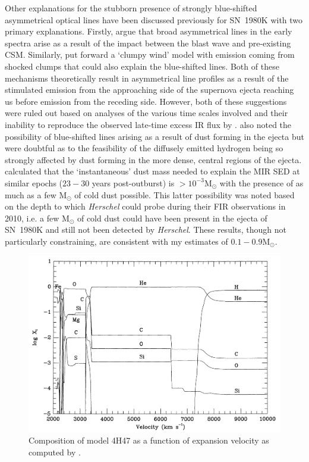 Other explanations for the stubborn presence of strongly blue-shifted asymmetrical optical lines have been discussed previously for SN~1980K  with two primary explanations.  Firstly, \citet{Fesen1990} argue that broad asymmetrical lines in the early spectra arise as a result of the impact between the blast wave and pre-existing CSM.  Similarly, \citet{Chugai1994} put forward a `clumpy wind' model with emission coming from shocked clumps that could also explain the blue-shifted lines.  Both of these mechanisms theoretically result in asymmetrical line profiles as a result of the stimulated emission from the approaching side of the supernova ejecta reaching us before emission from the receding side.  However, both of these suggestions were ruled out based on analyses of the various time scales involved and their inability to reproduce the observed late-time excess IR flux by \citet{Sugerman2012}.  \citet{Fesen1990}  also noted the possibility of blue-shifted lines  arising as a result of dust forming in the ejecta but were doubtful as to the feasibility of the diffusely emitted hydrogen being so strongly affected by dust forming in the more dense, central regions of the ejecta.  \citet{Sugerman2012} calculated that the `instantaneous' dust mass needed to explain the MIR SED at similar epochs ($23-30$ years post-outburst) is $>10^{-3}$M$_{\odot}$ with the presence of as much as a few M$_{\odot}$ of cold dust possible.  This latter possibility was noted based on the depth to which {\em Herschel} could probe during their FIR observations in 2010, i.e. a few M$_{\odot}$ of cold dust could have been present in the ejecta of SN~1980K and still not been detected by {\em Herschel}.  These results, though not particularly constraining, are consistent with my estimates of $0.1-0.9$M$_{\odot}$.

\begin{figure}
\centering
\includegraphics[scale=0.4,clip=true, trim=30 0 0 0]{chapters/chapter6/figs/93J/explosion_model.png}
\caption{Composition of model 4H47 as a function of expansion velocity as computed by \citet{Nomoto1993}.}
\label{4h47}
\end{figure}

